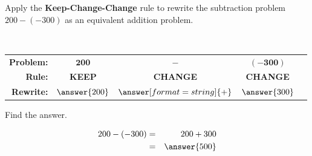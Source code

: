 \documentclass{ximera}[font=12pt]
\begin{document}
\begin{problem}
    Apply the \textbf{Keep-Change-Change} rule to rewrite the subtraction problem $200 -(-300)$ as an equivalent 
    addition problem.  

    ~ \\[2em]
    \begin{center}
    \renewcommand{\arraystretch}{2} %
    \begin{tabular}{rcccl}
        \textbf{Problem:} & \Large $\mathbf{200}$ & \Huge $\mathbf{-}$ & \Large $\mathbf{(-300)}$ & \\
        \textbf{Rule:}     & \textcolor{OliveGreen!90!black}{\textbf{KEEP}} & \textcolor{orange!80!black}{\textbf{CHANGE}} & 
        \textcolor{orange!80!black}{\textbf{CHANGE}} & \\
        \textbf{Rewrite:}  &  $\answer{200}$ &  $\answer[format=string]{+}$ & $\answer{300}$ &
    \end{tabular}
    \end{center}
                                                                
    \begin{problem}
    Find the answer.                                                        

    \begin{eqnarray*}
       200 -(-300) &=& 200 + 300 \\ 
                &=& \answer{500} 
    \end{eqnarray*}   
 
 
\end{problem}
\end{problem}


      
\end{document}
